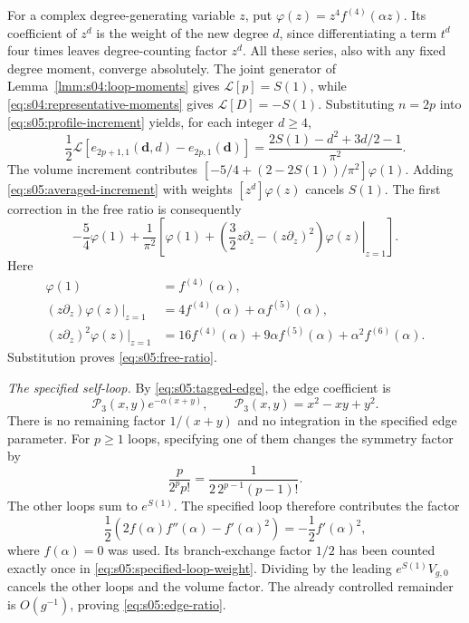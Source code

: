\begin{prf}
For a complex degree-generating variable $z$, put
$\varphi(z)=z^4f^{(4)}(\alpha z)$. Its coefficient of $z^d$
is the weight of the new degree $d$, since differentiating a term
$t^d$ four times leaves degree-counting factor $z^d$.
All these series, also with any fixed degree moment, converge
absolutely. The joint generator of Lemma~\ref{lmm:s04:loop-moments}
gives $\mathcal L[p]=S(1)$, while
\eqref{eq:s04:representative-moments} gives
$\mathcal L[D]=-S(1)$. Substituting $n=2p$ into
\eqref{eq:s05:profile-increment} yields, for each integer $d\geq4$,
\begin{equation}\label{eq:s05:averaged-increment}
 \frac12\mathcal L\left[
   e_{2p+1,1}(\mathbf d,d)-e_{2p,1}(\mathbf d)\right]
 =\frac{2S(1)-d^2+3d/2-1}{\pi^2}.
\end{equation}
The volume increment contributes
$[-5/4+(2-2S(1))/\pi^2]\varphi(1)$.
Adding \eqref{eq:s05:averaged-increment} with weights
$[z^d]\varphi(z)$ cancels $S(1)$. The first correction in the
free ratio is consequently
\begin{equation}\label{eq:s05:free-moment}
 -\frac54\varphi(1)+\frac1{\pi^2}
 \left[\varphi(1)+\left.
  \left(\frac32z\partial_z-(z\partial_z)^2\right)
                  \varphi(z)\right|_{z=1}\right].
\end{equation}
Here
\begin{align*}
 \varphi(1)&=f^{(4)}(\alpha),\\
 (z\partial_z)\varphi(z)|_{z=1}
       &=4f^{(4)}(\alpha)+\alpha f^{(5)}(\alpha),\\
 (z\partial_z)^2\varphi(z)|_{z=1}
       &=16f^{(4)}(\alpha)+9\alpha f^{(5)}(\alpha)
                                     +\alpha^2f^{(6)}(\alpha).
\end{align*}
Substitution proves \eqref{eq:s05:free-ratio}.

\emph{The specified self-loop.}
By \eqref{eq:s05:tagged-edge}, the edge coefficient is
\[
 \mathcal P_3(x,y)e^{-\alpha(x+y)},\qquad
 \mathcal P_3(x,y)=x^2-xy+y^2.
\]
There is no remaining factor $1/(x+y)$ and no integration in the
specified edge parameter.
For $p\geq1$ loops, specifying one of them changes the symmetry
factor by
\begin{equation}\label{eq:s05:specified-loop-weight}
 \frac{p}{2^pp!}=\frac1{2\,2^{p-1}(p-1)!}.
\end{equation}
The other loops sum to $e^{S(1)}$. The specified loop therefore
contributes the factor
\[
 \frac12\left(2f(\alpha)f''(\alpha)-f'(\alpha)^2\right)
       =-\frac12f'(\alpha)^2,
\]
where $f(\alpha)=0$ was used. Its branch-exchange factor $1/2$
has been counted exactly once in
\eqref{eq:s05:specified-loop-weight}. Dividing by the leading
$e^{S(1)}V_{g,0}$ cancels the other loops and the volume factor.
The already controlled remainder is $O(g^{-1})$, proving
\eqref{eq:s05:edge-ratio}.
\end{prf}

